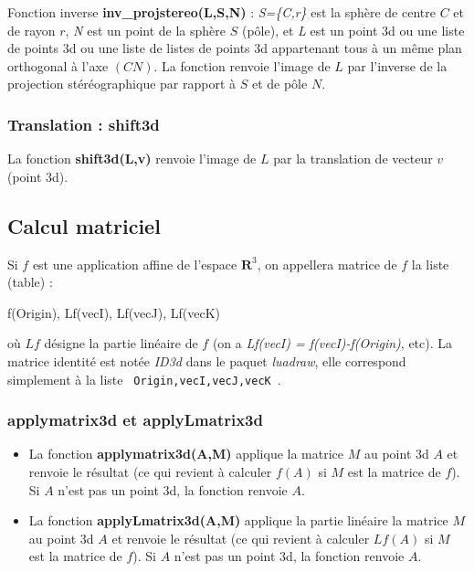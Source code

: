 Fonction inverse \textbf{inv\_projstereo(L,S,N)} : \emph{S=\{C,r\}} est la sphère de centre $C$ et de rayon $r$, \emph{N} est un point de la sphère $S$ (pôle), et \emph{L} est un point 3d ou une liste de points 3d ou une liste de listes de points 3d appartenant tous à un même plan orthogonal à l'axe $(CN)$. La fonction renvoie l'image de $L$ par l'inverse de la projection stéréographique par rapport à $S$ et de pôle $N$.


\subsubsection{Translation : shift3d}

La fonction \textbf{shift3d(L,v)} renvoie l'image de $L$ par la translation de vecteur $v$ (point 3d).

\subsection{Calcul matriciel}

Si $f$ est une application affine de l'espace $\mathbf R^3$, on appellera matrice de $f$ la liste (table) :
\begin{Luacode}
{ f(Origin), Lf(vecI), Lf(vecJ), Lf(vecK) }
\end{Luacode}
où $Lf$ désigne la partie linéaire de $f$ (on a \emph{Lf(vecI) = f(vecI)-f(Origin)}, etc). La matrice identité est notée \emph{ID3d} dans le paquet \emph{luadraw}, elle correspond simplement à la liste \texttt{ {Origin,vecI,vecJ,vecK} }.

\subsubsection{applymatrix3d et applyLmatrix3d}

\begin{itemize}
    \item La fonction \textbf{applymatrix3d(A,M)} applique la matrice $M$ au point 3d $A$ et renvoie le résultat (ce qui revient à calculer $f(A)$ si $M$ est la matrice de $f$). Si $A$ n'est pas un point 3d, la fonction renvoie $A$.
    
    \item La fonction \textbf{applyLmatrix3d(A,M)} applique la partie linéaire la matrice $M$ au point 3d $A$ et renvoie le résultat (ce qui revient à calculer $Lf(A)$ si $M$ est la matrice de $f$). Si $A$ n'est pas un point 3d, la fonction renvoie $A$.
\end{itemize}

